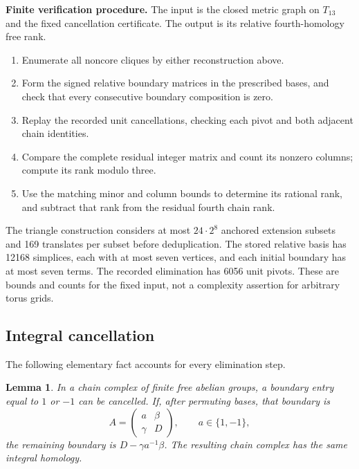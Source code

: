 \documentclass[11pt]{amsart}
\newtheorem{lemma}[theorem]{Lemma}
\begin{document}
\medskip
\noindent\textbf{Finite verification procedure.}
The input is the closed metric graph on $T_{13}$ and the fixed cancellation
certificate. The output is its relative fourth-homology free rank.
\begin{enumerate}
\item Enumerate all noncore cliques by either reconstruction above.
\item Form the signed relative boundary matrices in the prescribed bases,
      and check that every consecutive boundary composition is zero.
\item Replay the recorded unit cancellations, checking each pivot and both
      adjacent chain identities.
\item Compare the complete residual integer matrix and count its nonzero
      columns; compute its rank modulo three.
\item Use the matching minor and column bounds to determine its rational
      rank, and subtract that rank from the residual fourth chain rank.
\end{enumerate}
The triangle construction considers at most $24\cdot2^8$ anchored
extension subsets and 169 translates per subset before deduplication.
The stored relative basis has 12168 simplices, each with at most seven
vertices, and each initial boundary has at most seven terms.
The recorded elimination has 6056 unit pivots. These are bounds and counts
for the fixed input, not a complexity assertion for arbitrary torus grids.

\subsection{Integral cancellation}
The following elementary fact accounts for every elimination step.

\begin{lemma}\label{lem:cancellation}
In a chain complex of finite free abelian groups, a boundary entry equal
to $1$ or $-1$ can be cancelled. If, after permuting bases, that boundary is
\[
 A=\begin{pmatrix}a&\beta\\ \gamma&D\end{pmatrix},\qquad a\in\{1,-1\},
\]
the remaining boundary is $D-\gamma a^{-1}\beta$. The resulting chain
complex has the same integral homology.
\end{lemma}
\end{document}
